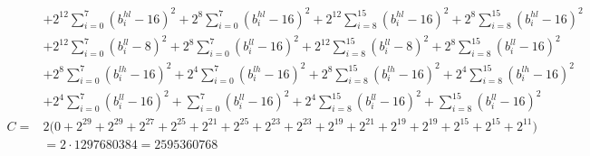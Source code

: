 \documentclass[fleqn]{article}
\begin{document}
{\[{\begin{aligned}
  & + 2^{12}\!\sum_{i=0}^{7}(b_i^{hl}{-}16)^2 + 2^{8}\!\sum_{i=0}^{7}(b_i^{hl}{-}16)^2 + 2^{12}\!\sum_{i=8}^{15}(b_i^{hl}{-}16)^2 + 2^{8}\!\sum_{i=8}^{15}(b_i^{hl}{-}16)^2 \\
  & + 2^{12}\!\sum_{i=0}^{7}(b_i^{ll}{-}8)^2 + 2^{8}\!\sum_{i=0}^{7}(b_i^{ll}{-}16)^2 + 2^{12}\!\sum_{i=8}^{15}(b_i^{ll}{-}8)^2 + 2^{8}\!\sum_{i=8}^{15}(b_i^{ll}{-}16)^2 \\
  & + 2^{8}\!\sum_{i=0}^{7}(b_i^{lh}{-}16)^2 + 2^{4}\!\sum_{i=0}^{7}(b_i^{lh}{-}16)^2 + 2^{8}\!\sum_{i=8}^{15}(b_i^{lh}{-}16)^2 + 2^{4}\!\sum_{i=8}^{15}(b_i^{lh}{-}16)^2 \\
  & + 2^{4}\!\sum_{i=0}^{7}(b_i^{ll}{-}16)^2 + \sum_{i=0}^{7}(b_i^{ll}{-}16)^2 + 2^{4}\!\sum_{i=8}^{15}(b_i^{ll}{-}16)^2 + \sum_{i=8}^{15}(b_i^{ll}{-}16)^2 \\[0.35em]
C ={}& 2\big(0 + 2^{29} + 2^{29} + 2^{27} + 2^{25} + 2^{21} + 2^{25} + 2^{23} + 2^{23} + 2^{19} + 2^{21} + 2^{19} + 2^{19} + 2^{15} + 2^{15} + 2^{11}\big) \\
  & = 2\cdot 1297680384 = 2595360768
\end{aligned}
\;}
\]
}
\end{document}
